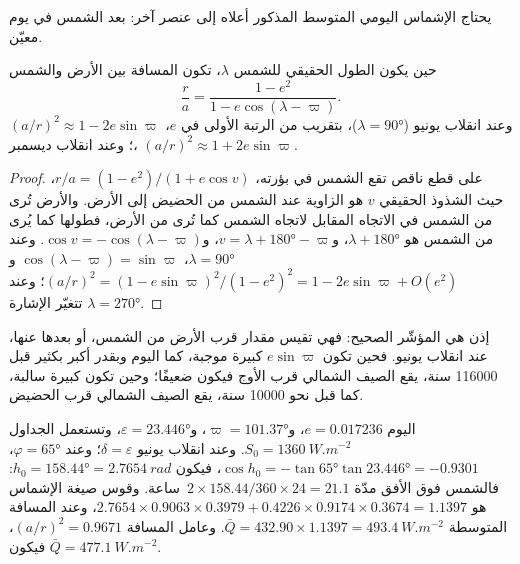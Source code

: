 يحتاج الإشماس اليومي المتوسط المذكور أعلاه إلى عنصر آخر: بعد الشمس في
يوم معيّن.

\begin{proposition}\label{prop:b2:orbital-forcing:distance}
حين يكون الطول الحقيقي للشمس $\lambda$، تكون المسافة بين الأرض والشمس
\[
  \frac{r}{a} = \frac{1 - e^2}{1 - e\cos(\lambda - \varpi)} .
\]
وعند انقلاب يونيو ($\lambda = \ang{90}$)، بتقريب من الرتبة الأولى في $e$،
$(a/r)^2 \approx 1 - 2e\sin\varpi$؛ وعند انقلاب ديسمبر، $(a/r)^2 \approx 1 + 2e\sin\varpi$.
\end{proposition}

\begin{proof}
على قطع ناقص تقع الشمس في بؤرته، $r/a = (1 - e^2)/(1 + e\cos v)$، حيث الشذوذ الحقيقي $v$
هو الزاوية عند الشمس من الحضيض إلى الأرض. والأرض تُرى من الشمس في
الاتجاه المقابل لاتجاه الشمس كما تُرى من الأرض، فطولها كما يُرى من الشمس هو
$\lambda + \ang{180}$، و$v = \lambda + \ang{180} - \varpi$، و$\cos v = -\cos(\lambda - \varpi)$.
وعند $\lambda = \ang{90}$، $\cos(\lambda - \varpi) = \sin\varpi$ و$(a/r)^2 = (1 -
e\sin\varpi)^2/(1 - e^2)^2 = 1 - 2e\sin\varpi + O(e^2)$؛ وعند $\lambda = \ang{270}$ تتغيّر الإشارة.
\end{proof}

 إذن هي المؤشّر الصحيح: فهي تقيس مقدار قرب الأرض من الشمس، أو
بعدها عنها، عند انقلاب يونيو. فحين تكون $e\sin\varpi$ كبيرة موجبة، كما اليوم
وبقدر أكبر بكثير قبل \num{116000} سنة، يقع الصيف الشمالي قرب الأوج فيكون ضعيفًا؛ وحين تكون
كبيرة سالبة، كما قبل نحو \num{10000} سنة، يقع الصيف الشمالي قرب الحضيض.

\begin{example}\label{ex:b2:orbital-forcing:today}
اليوم $e = 0.017236$، و$\varpi = \ang{101.37}$، و$\varepsilon = \ang{23.446}$، وتستعمل الجداول
$S_0 = \qty{1360}{W.m^{-2}}$. وعند انقلاب يونيو $\delta = \varepsilon$؛ وعند $\varphi =
\ang{65}$، $\cos h_0 = -\tan\ang{65}\tan\ang{23.446} = -0.9301$، فيكون $h_0 = \ang{158.44} =
\qty{2.7654}{rad}$: فالشمس فوق الأفق مدّة $2 \times 158.44/360 \times 24 = 21.1$~ساعة. وقوس
صيغة الإشماس هو $2.7654 \times 0.9063 \times 0.3979 + 0.4226 \times 0.9174 \times 0.3674 =
1.1397$، وعند المسافة المتوسطة $\bar Q = 432.90 \times 1.1397 = \qty{493.4}{W.m^{-2}}$.
وعامل المسافة $(a/r)^2 = 0.9671$، فيكون $\bar Q = \qty{477.1}{W.m^{-2}}$.
\end{example}

